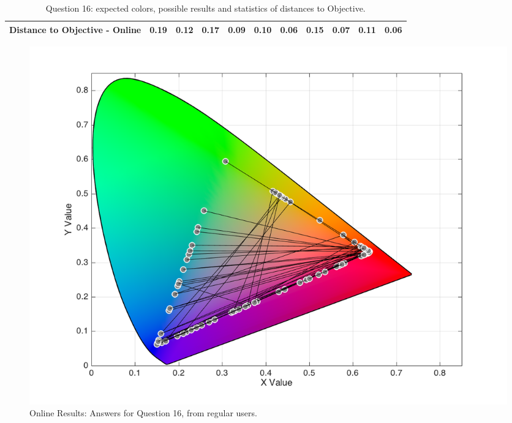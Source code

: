 \begin{table}[H]
{\begin{tabular}{lccccccccccccc}
    \multicolumn{4}{l}{Distance to Objective - Online}                                                                                               & \multicolumn{1}{|c}{0.19}        & \multicolumn{1}{c|}{0.12}    & \multicolumn{1}{|c}{0.17}        & \multicolumn{1}{c|}{0.09}    & \multicolumn{1}{|c}{\textbf{0.10}}       & \multicolumn{1}{c|}{0.06}    & \multicolumn{1}{|c}{0.15}        & \multicolumn{1}{c|}{0.07}    & \multicolumn{1}{|c}{0.11}       & \multicolumn{1}{c|}{0.06}    \\ \hline
    \end{tabular}}
  \caption[Question 16, with expected Results.]{Question 16: expected colors, possible results and statistics of distances to Objective.}
  \label{table:lab_q16_expected}
\end{table}
%
\begin{figure}[htbp]
  \centering
  \begin{minipage}{0.48\textwidth}
    \centering
    \includegraphics[width=\textwidth]{images/results/16_online_regularUsers.png}
    \caption[Online Results: Answers for Question 16, from regular users.]{Online Results: Answers for Question 16, from regular users.}
    \label{fig:onlineregular_16}
  \end{minipage}\hfill
  \begin{minipage}{0.48\textwidth}
    \centering

\end{minipage}
\end{figure}
